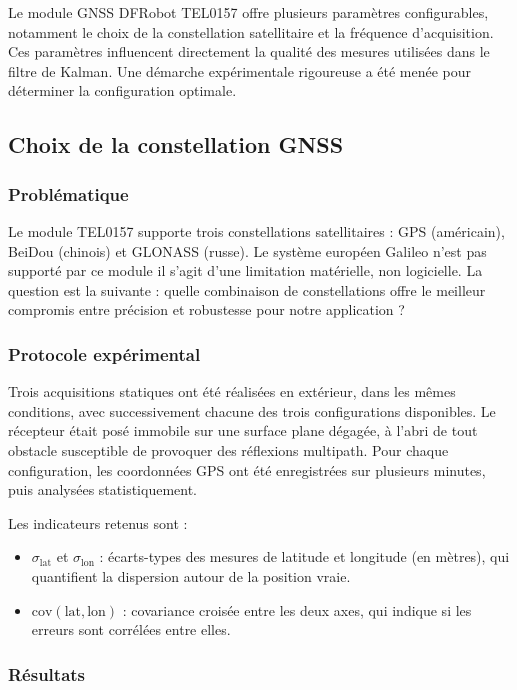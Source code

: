 Le module GNSS DFRobot TEL0157 offre plusieurs paramètres configurables,
notamment le choix de la constellation satellitaire et la fréquence
d'acquisition. Ces paramètres influencent directement la qualité des mesures
utilisées dans le filtre de Kalman. Une démarche expérimentale rigoureuse a
été menée pour déterminer la configuration optimale.

\subsection{Choix de la constellation GNSS}

\subsubsection{Problématique}

Le module TEL0157 supporte trois constellations satellitaires : GPS (américain),
BeiDou (chinois) et GLONASS (russe). Le système européen Galileo n'est pas
supporté par ce module il s'agit d'une limitation matérielle, non logicielle.
La question est la suivante : quelle combinaison de constellations offre le
meilleur compromis entre précision et robustesse pour notre application ?

\subsubsection{Protocole expérimental}

Trois acquisitions statiques ont été réalisées en extérieur, dans les mêmes
conditions, avec successivement chacune des trois configurations disponibles.
Le récepteur était posé immobile sur une surface plane dégagée, à l'abri de
tout obstacle susceptible de provoquer des réflexions multipath. Pour chaque
configuration, les coordonnées GPS ont été enregistrées sur plusieurs minutes,
puis analysées statistiquement.

Les indicateurs retenus sont :
\begin{itemize}
    \item $\sigma_{\text{lat}}$ et $\sigma_{\text{lon}}$ : écarts-types des
    mesures de latitude et longitude (en mètres), qui quantifient la dispersion
    autour de la position vraie.
    \item $\text{cov}(\text{lat}, \text{lon})$ : covariance croisée entre les
    deux axes, qui indique si les erreurs sont corrélées entre elles.
\end{itemize}

\subsubsection{Résultats}

